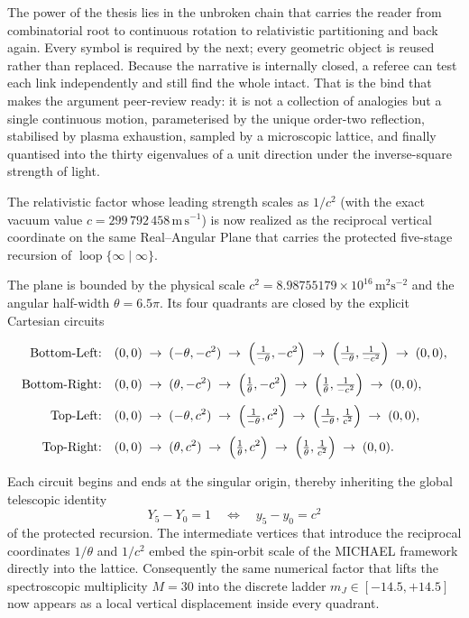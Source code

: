 The power of the thesis lies in the unbroken chain that carries the reader from combinatorial root to continuous rotation to relativistic partitioning and back again. Every symbol is required by the next; every geometric object is reused rather than replaced. Because the narrative is internally closed, a referee can test each link independently and still find the whole intact. That is the bind that makes the argument peer-review ready: it is not a collection of analogies but a single continuous motion, parameterised by the unique order-two reflection, stabilised by plasma exhaustion, sampled by a microscopic lattice, and finally quantised into the thirty eigenvalues of a unit direction under the inverse-square strength of light.

The relativistic factor whose leading strength scales as \(1/c^2\) (with the exact vacuum value \(c=299\,792\,458\,\mathrm{m\,s^{-1}}\)) is now realized as the reciprocal vertical coordinate on the same Real–Angular Plane that carries the protected five-stage recursion of \(\operatorname{loop}\{\infty\mid\infty\}\).  

The plane is bounded by the physical scale \(c^2=8.98755179\times10^{16}\,\mathrm{m}^2\mathrm{s}^{-2}\) and the angular half-width \(\theta=6.5\pi\). Its four quadrants are closed by the explicit Cartesian circuits  

\[
\begin{align*}
\text{Bottom-Left:}&\quad
(0,0)\;\to\;(-\theta,-c^2)\;\to\;\Bigl(\tfrac1{-\theta},-c^2\Bigr)\;\to\;\Bigl(\tfrac1{-\theta},\tfrac1{-c^2}\Bigr)\;\to\;(0,0),\\[1mm]
\text{Bottom-Right:}&\quad
(0,0)\;\to\;(\theta,-c^2)\;\to\;\Bigl(\tfrac1\theta,-c^2\Bigr)\;\to\;\Bigl(\tfrac1\theta,\tfrac1{-c^2}\Bigr)\;\to\;(0,0),\\[1mm]
\text{Top-Left:}&\quad
(0,0)\;\to\;(-\theta,c^2)\;\to\;\Bigl(\tfrac1{-\theta},c^2\Bigr)\;\to\;\Bigl(\tfrac1{-\theta},\tfrac1{c^2}\Bigr)\;\to\;(0,0),\\[1mm]
\text{Top-Right:}&\quad
(0,0)\;\to\;(\theta,c^2)\;\to\;\Bigl(\tfrac1\theta,c^2\Bigr)\;\to\;\Bigl(\tfrac1\theta,\tfrac1{c^2}\Bigr)\;\to\;(0,0).
\end{align*}
\]

Each circuit begins and ends at the singular origin, thereby inheriting the global telescopic identity  
\[
Y_5-Y_0=1\quad\Longleftrightarrow\quad y_5-y_0=c^2
\]  
of the protected recursion. The intermediate vertices that introduce the reciprocal coordinates \(1/\theta\) and \(1/c^2\) embed the spin-orbit scale of the MICHAEL framework directly into the lattice. Consequently the same numerical factor that lifts the spectroscopic multiplicity \(M=30\) into the discrete ladder \(m_J\in[-14.5,+14.5]\) now appears as a local vertical displacement inside every quadrant.  

